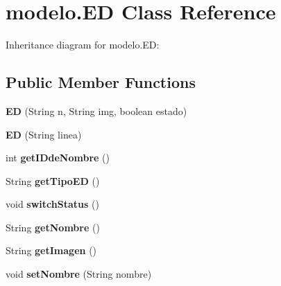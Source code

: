 \hypertarget{classmodelo_1_1_e_d}{}\section{modelo.\+ED Class Reference}
\label{classmodelo_1_1_e_d}


Inheritance diagram for modelo.\+ED\+:
\subsection*{Public Member Functions}
\begin{DoxyCompactItemize}
\item 
\mbox{\label{classmodelo_1_1_e_d_ad95b8183b75d33d1e69555041e595262}} 
{\bfseries ED} (String n, String img, boolean estado)
\item 
\mbox{\label{classmodelo_1_1_e_d_a4a78274dca0082f34ea7c03bb8b34bdd}} 
{\bfseries ED} (String linea)
\item 
\mbox{\label{classmodelo_1_1_e_d_a3a831edc54f3b1d9451ad9358e18c63b}} 
int {\bfseries get\+I\+Dde\+Nombre} ()
\item 
\mbox{\label{classmodelo_1_1_e_d_a5544596d88811fba6207e688d862d675}} 
String {\bfseries get\+Tipo\+ED} ()
\item 
\mbox{\label{classmodelo_1_1_e_d_a56fdd989da6d3ae993efbd8732dea073}} 
void {\bfseries switch\+Status} ()
\item 
\mbox{\label{classmodelo_1_1_e_d_a4ff6ff8bd69e9d8a18cc93c544648ea7}} 
String {\bfseries get\+Nombre} ()
\item 
\mbox{\label{classmodelo_1_1_e_d_a88e344ca2fceda1e27d2d7c373dc0b61}} 
String {\bfseries get\+Imagen} ()
\item 
\mbox{\label{classmodelo_1_1_e_d_a5650f97fda341ffe61c2a5f86865540e}} 
void {\bfseries set\+Nombre} (String nombre)
\item 
\mbox{\label{classmodelo_1_1_e_d_a69fdfb590fdb2bca589aace8c760922d}} 

\end{DoxyCompactItemize}

